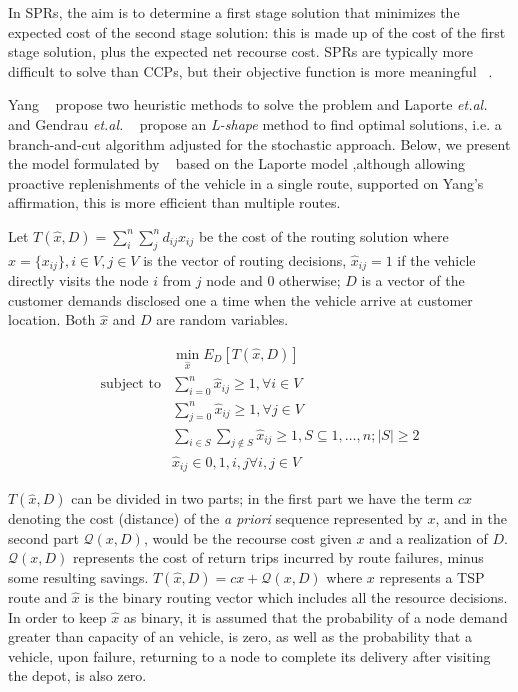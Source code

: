 In SPRs, the aim is to determine a first stage solution that minimizes the expected cost of the second stage solution: this is made up of the cost of the first stage solution, plus the expected net recourse cost. SPRs are typically more difficult to solve than CCPs, but their objective function is more meaningful ~\cite{gendreau_stochastic_1996}.


Yang ~\cite{yang_stochastic_2000} propose two heuristic methods to solve the problem and Laporte \textit{et.al.}  ~\cite{laporte_integer_2002} and Gendrau \textit{et.al.} ~\cite{gendreau_exact_1995} propose an \textit{L-shape} method to find optimal solutions, i.e. a branch-and-cut algorithm adjusted for the stochastic approach. Below, we present the model formulated by ~\cite{Dror_2005} based on the Laporte model ,although allowing proactive replenishments of the vehicle in a single route, supported on Yang's affirmation, this is more efficient than multiple routes.

Let $T(\hat{x},D) =\sum_i^n\sum_j^nd_{ij}x_{ij}$ be the cost of the routing solution where $\hat{x}=\{x_{ij}\},i\in V,j\in V$ is the vector of routing decisions, $\hat{x}_{ij} =1$ if the vehicle directly visits the node $i$ from $j$ node and $0$ otherwise; $D$ is a vector of the customer demands disclosed one a time when the vehicle arrive at customer location. Both $\hat{x}$ and $D$ are random variables.

\begin{align}\label{eq:SPR}
  & \min\limits_{\hat{x}} E_D[T(\hat{x},D)]\\ 
 \text{subject to} & \sum_{i=0}^n\hat{x}_{ij} \geq 1, \forall i \in V\\
  & \sum_{j=0}^n\hat{x}_{ij} \geq 1, \forall j \in V\\
  & \sum_{i\in S}\sum_{j\notin S}\hat{x}_{ij} \geq 1, S\subseteq {1,\ldots,n};|S|\geq2\\
  & \hat{x}_{ij} \in {0,1}, i,j \forall i,j \in V
\end{align}

$T(\hat{x},D)$ can be divided in two parts; in the first part we have the term $cx$ denoting the cost (distance) of the \textit{a priori} sequence represented by $x$, and in the second part $\mathcal{Q}(x,D)$, would be the recourse cost given $x$ and a realization of $D$. $\mathcal{Q}(x,D)$ represents the cost of return trips incurred by route failures, minus some resulting savings.
$T(\hat{x},D) = cx+\mathcal{Q}(x,D)$ where $x$ represents a TSP route and $\hat{x}$ is the binary routing vector which includes all the resource decisions. In order to keep $\hat{x}$ as binary, it is assumed that the probability of a node demand greater than capacity of an vehicle, is zero, as well as the probability that a vehicle, upon failure, returning to a node to complete its delivery after visiting the depot, is also zero.

